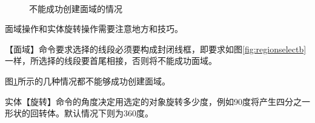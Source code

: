 \begin{figure}[htbp]
\centering
{}\hspace{20pt}
\\
\hspace{20pt}
\caption{不能成功创建面域的情况}\label{fig:buchengong}
\end{figure}

面域操作和实体旋转操作需要注意地方和技巧。
\begin{tips}
\item 【面域】命令要求选择的线段必须要构成封闭线框，即要求如图\ref{fig:regionselectb}一样，所选择的线段要首尾相接，否则将不能成功面域。
\item 图\ref{fig:buchengong}所示的几种情况都不能够成功创建面域。

\item 实体【旋转】命令的角度决定用选定的对象旋转多少度，例如90度将产生四分之一形状的回转体。默认情况下则为360度。
\end{tips}
\endinput